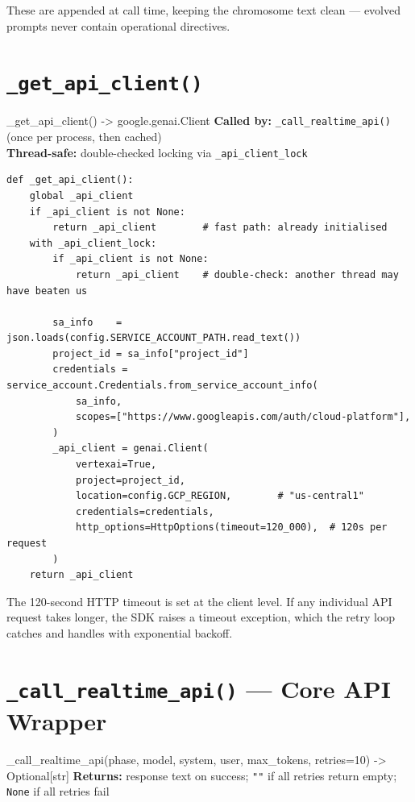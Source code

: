 \documentclass[11pt,a4paper]{report}
\newcommand{\fn}[1]{\texttt{#1}}
\begin{document}
These are appended at call time, keeping the chromosome text clean --- evolved prompts
never contain operational directives.

\section{\fn{\_get\_api\_client()}}

\begin{specbox}{\_get\_api\_client() -> google.genai.Client}
\textbf{Called by:} \fn{\_call\_realtime\_api()} (once per process, then cached)\\
\textbf{Thread-safe:} double-checked locking via \fn{\_api\_client\_lock}
\end{specbox}

\begin{lstlisting}[style=example]
def _get_api_client():
    global _api_client
    if _api_client is not None:
        return _api_client        # fast path: already initialised
    with _api_client_lock:
        if _api_client is not None:
            return _api_client    # double-check: another thread may have beaten us

        sa_info    = json.loads(config.SERVICE_ACCOUNT_PATH.read_text())
        project_id = sa_info["project_id"]
        credentials = service_account.Credentials.from_service_account_info(
            sa_info,
            scopes=["https://www.googleapis.com/auth/cloud-platform"],
        )
        _api_client = genai.Client(
            vertexai=True,
            project=project_id,
            location=config.GCP_REGION,        # "us-central1"
            credentials=credentials,
            http_options=HttpOptions(timeout=120_000),  # 120s per request
        )
    return _api_client
\end{lstlisting}

The 120-second HTTP timeout is set at the client level.  If any individual API request
takes longer, the SDK raises a timeout exception, which the retry loop catches and
handles with exponential backoff.

\section{\fn{\_call\_realtime\_api()} --- Core API Wrapper}

\begin{specbox}{\_call\_realtime\_api(phase, model, system, user, max\_tokens, retries=10) -> Optional[str]}
\textbf{Returns:} response text on success; \fn{""} if all retries return empty; \fn{None} if all retries fail
\end{specbox}
\end{document}
